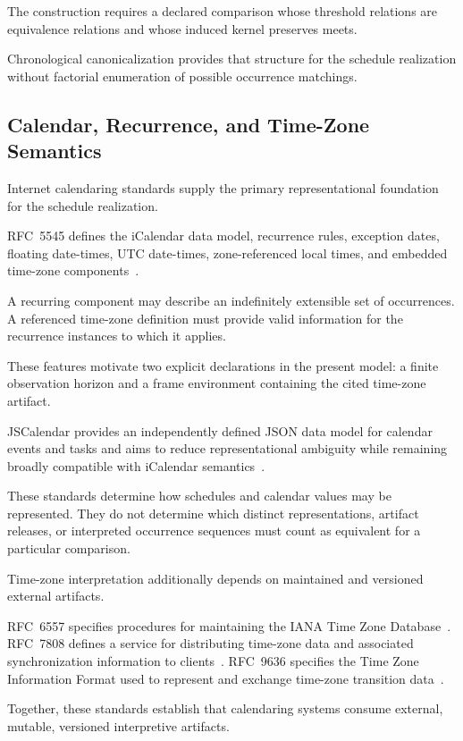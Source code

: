 \documentclass[11pt]{article}
\theoremstyle{plain}
\theoremstyle{definition}
\theoremstyle{remark}
\begin{document}
The construction requires
a declared comparison
whose threshold relations
are equivalence relations
and whose induced kernel
preserves meets.

Chronological canonicalization
provides that structure
for the schedule realization
without factorial enumeration
of possible occurrence matchings.

\subsection{Calendar, Recurrence, and Time-Zone Semantics}

Internet calendaring standards
supply the primary representational foundation
for the schedule realization.

RFC~5545 defines
the iCalendar data model,
recurrence rules,
exception dates,
floating date-times,
UTC date-times,
zone-referenced local times,
and embedded time-zone components~\citep{rfc5545}.

A recurring component
may describe an indefinitely extensible
set of occurrences.
A referenced time-zone definition
must provide valid information
for the recurrence instances
to which it applies.

These features motivate
two explicit declarations
in the present model:
a finite observation horizon
and a frame environment
containing the cited time-zone artifact.

JSCalendar provides
an independently defined JSON data model
for calendar events and tasks
and aims to reduce representational ambiguity
while remaining broadly compatible
with iCalendar semantics~\citep{rfc8984}.

These standards determine
how schedules and calendar values
may be represented.
They do not determine
which distinct representations,
artifact releases,
or interpreted occurrence sequences
must count as equivalent
for a particular comparison.

Time-zone interpretation additionally depends
on maintained and versioned external artifacts.

RFC~6557 specifies procedures
for maintaining
the IANA Time Zone Database~\citep{rfc6557}.
RFC~7808 defines a service
for distributing time-zone data
and associated synchronization information
to clients~\citep{rfc7808}.
RFC~9636 specifies
the Time Zone Information Format
used to represent and exchange
time-zone transition data~\citep{rfc9636}.

Together,
these standards establish
that calendaring systems consume
external,
mutable,
versioned interpretive artifacts.
\end{document}
